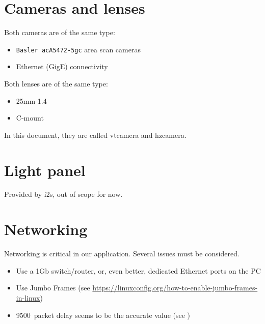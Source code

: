 \section{Cameras and lenses}

Both cameras are of the same type:

\begin{itemize}
    \item \texttt{Basler acA5472-5gc} area scan cameras
    \item Ethernet (GigE) connectivity
\end{itemize}

Both lenses are of the same type:

\begin{itemize}
    \item 25mm 1.4
    \item C-mount
\end{itemize}

In this document, they are called \gls{vtcamera} and \gls{hzcamera}.


\section{Light panel}

Provided by i2s, out of scope for now.

\section{Networking}

Networking is critical in our application. Several issues must be considered.

\begin{itemize}
    \item Use a 1Gb switch/router, or, even better, dedicated Ethernet ports on the PC
    \item Use Jumbo Frames (see \url{https://linuxconfig.org/how-to-enable-jumbo-frames-in-linux})
    \item 9500~packet delay seems to be the accurate value (see )
\end{itemize}
